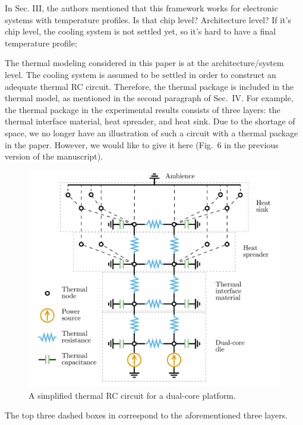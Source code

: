 \begin{reviewer}
In Sec. III, the authors mentioned that this framework works for electronic systems with temperature profiles. Is that chip level? Architecture level? If it’s chip level, the cooling system is not settled yet, so it’s hard to have a final temperature profile;
\end{reviewer}
\begin{authors}
The thermal modeling considered in this paper is at the architecture/system level.
The cooling system is assumed to be settled in order to construct an adequate thermal RC circuit.
Therefore, the thermal package is included in the thermal model, as mentioned in the second paragraph of Sec.~IV.
For example, the thermal package in the experimental results consists of three layers: the thermal interface material, heat spreader, and heat sink.
Due to the shortage of space, we no longer have an illustration of such a circuit with a thermal package in the paper.
However, we would like to give it here (Fig.~6 in the previous version of the manuscript).
\begin{figure}[!h]
  \centering
  \includegraphics[width=0.5\linewidth]{include/assets/circuit.pdf}
  \vspace{-0.5em}
  \caption{A simplified thermal RC circuit for a dual-core platform.}
\end{figure}

The top three dashed boxes in  correspond to the aforementioned three layers.

\end{authors}

